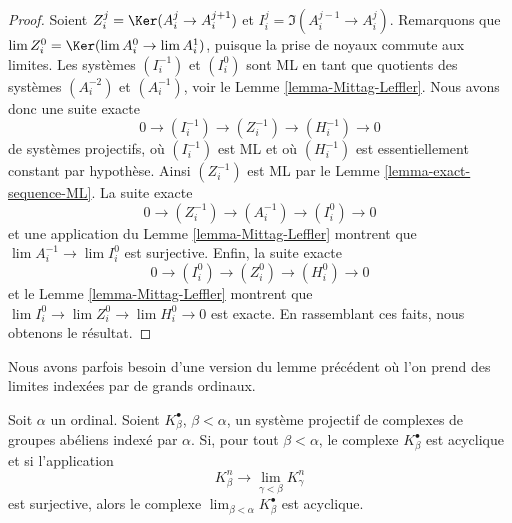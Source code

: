 \begin{proof}
Soient $Z^j_i = \Ker(A^j_i \to A^{j + 1}_i)$ et
$I^j_i = \Im(A^{j - 1}_i \to A^j_i)$.
Remarquons que $\lim Z^0_i = \Ker(\lim A^0_i \to \lim A^1_i)$, puisque
la prise de noyaux commute aux limites.
Les systèmes $(I^{-1}_i)$ et $(I^0_i)$ sont ML en tant que quotients des
systèmes $(A^{-2}_i)$ et $(A^{-1}_i)$, voir le
Lemme \ref{lemma-Mittag-Leffler}.
Nous avons donc une suite exacte
$$
0 \to (I^{-1}_i) \to (Z^{-1}_i) \to (H^{-1}_i) \to 0
$$
de systèmes projectifs, où $(I^{-1}_i)$ est ML et où $(H^{-1}_i)$
est essentiellement constant par hypothèse.
Ainsi $(Z^{-1}_i)$ est ML par le
Lemme \ref{lemma-exact-sequence-ML}.
La suite exacte
$$
0 \to (Z^{-1}_i) \to (A^{-1}_i) \to (I^0_i) \to 0
$$
et une application du
Lemme \ref{lemma-Mittag-Leffler}
montrent que $\lim A^{-1}_i \to \lim I^0_i$ est surjective.
Enfin, la suite exacte
$$
0 \to (I^0_i) \to (Z^0_i) \to (H^0_i) \to 0
$$
et le
Lemme \ref{lemma-Mittag-Leffler}
montrent que $\lim I^0_i \to \lim Z^0_i \to \lim H^0_i \to 0$
est exacte. En rassemblant ces faits, nous obtenons le résultat.
\end{proof}

\noindent
Nous avons parfois besoin d'une version du lemme précédent où l'on prend
des limites indexées par de grands ordinaux.

\begin{lemma}
\label{lemma-ML-over-ordinals}
Soit $\alpha$ un ordinal. Soient $K_\beta^\bullet$, $\beta < \alpha$,
un système projectif de complexes de groupes abéliens indexé par $\alpha$.
Si, pour tout $\beta < \alpha$, le complexe $K_\beta^\bullet$ est acyclique
et si l'application
$$
K^n_\beta \longrightarrow \lim_{\gamma < \beta} K^n_\gamma
$$
est surjective, alors le complexe
$\lim_{\beta < \alpha} K_\beta^\bullet$ est acyclique.
\end{lemma}

